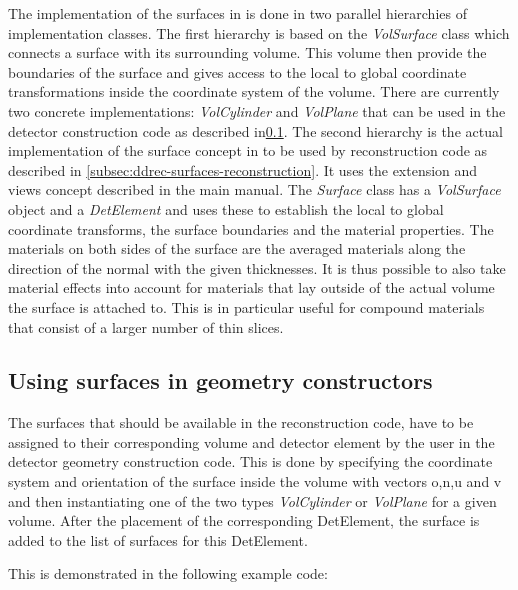 \documentclass[10pt,a4paper]{article}
\begin{document}
\noindent
The implementation of the surfaces in \DDR is done in two parallel hierarchies 
of implementation classes. The first hierarchy is based on the {\em VolSurface}
class which connects a surface with its surrounding volume.
This volume then provide the boundaries of the surface and gives access to 
the local to global coordinate transformations inside the coordinate system
of the volume. There are currently two concrete implementations: 
{\em VolCylinder} and {\em VolPlane} that can be used in the detector construction
code as described in\ref{subsec:ddrec-surfaces-constructors}.
The second hierarchy is the actual implementation of the surface concept in \DDR
to be used by reconstruction code as described in \ref{subsec:ddrec-surfaces-reconstruction}.
It uses the extension and views concept described in the main \DDH manual\cite{bib:DD4hepManual}.
The {\em Surface} class has a {\em VolSurface} object and a {\em DetElement} and 
uses these to establish the local to global coordinate transforms, the surface boundaries
and the material properties. The materials on both sides of the surface are
the averaged materials along the direction of the normal with the given thicknesses.
It is thus possible to also take material effects into account for materials
that lay outside of the actual volume the surface is attached to.
This is in particular useful for compound materials that consist of a larger number
of thin slices.

\subsection{Using surfaces in geometry constructors}
\label{subsec:ddrec-surfaces-constructors}
The surfaces that should be available in the reconstruction code, 
have to be assigned to their corresponding volume and detector element by the 
user in the detector geometry construction code. 
This is done by specifying the coordinate system
and orientation of the surface inside the volume with vectors o,n,u and v 
and then instantiating one of the two types {\em VolCylinder} or {\em VolPlane} for a 
given volume.
After the placement of the corresponding DetElement, the surface is added to the
list of surfaces for this DetElement.

\noindent
This is demonstrated in the  following example code:
\end{document}
